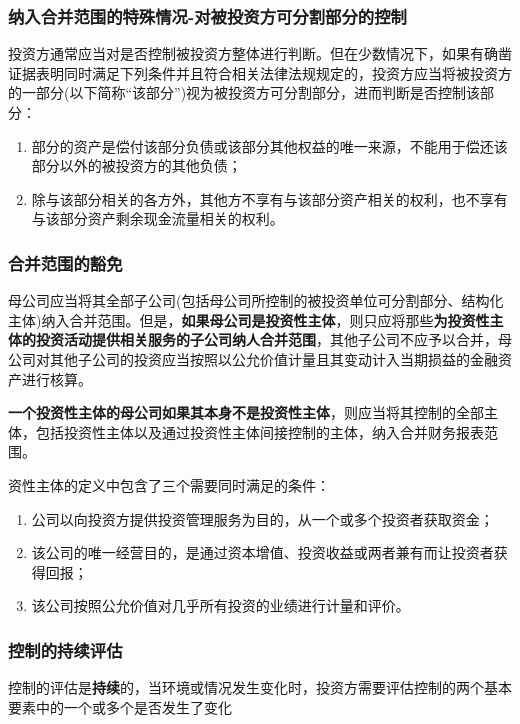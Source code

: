 \documentclass[UTF8,12pt]{ctexart}
\numberwithin{equation}{section} %
\numberwithin{figure}{section}
\numberwithin{table}{section}
\begin{document}
		
	\subsubsection{纳入合并范围的特殊情况-对被投资方可分割部分的控制}
	投资方通常应当对是否控制被投资方整体进行判断。但在少数情况下，如果有确凿证据表明同时满足下列条件并且符合相关法律法规规定的，投资方应当将被投资方的一部分(以下简称“该部分”)视为被投资方可分割部分，进而判断是否控制该部分：
	\begin{enumerate}
		\item 部分的资产是偿付该部分负债或该部分其他权益的唯一来源，不能用于偿还该部分以外的被投资方的其他负债；
		
		\item 除与该部分相关的各方外，其他方不享有与该部分资产相关的权利，也不享有与该部分资产剩余现金流量相关的权利。
	\end{enumerate}
	
	\subsubsection{合并范围的豁免}
	母公司应当将其全部子公司(包括母公司所控制的被投资单位可分割部分、结构化主体)纳入合并范围。但是，\textbf{如果母公司是投资性主体}，则只应将那些\textbf{为投资性主体的投资活动提供相关服务的子公司纳人合并范围}，其他子公司不应予以合并，母公司对其他子公司的投资应当按照以公允价值计量且其变动计入当期损益的金融资产进行核算。
	
	\textbf{一个投资性主体的母公司如果其本身不是投资性主体}，则应当将其控制的全部主体，包括投资性主体以及通过投资性主体间接控制的主体，纳入合并财务报表范围。
	
	资性主体的定义中包含了三个需要同时满足的条件：
	\begin{enumerate}
		\item 公司以向投资方提供投资管理服务为目的，从一个或多个投资者获取资金；
		
		\item 该公司的唯一经营目的，是通过资本增值、投资收益或两者兼有而让投资者获得回报；
		
		\item 该公司按照公允价值对几乎所有投资的业绩进行计量和评价。
	\end{enumerate}
	\subsubsection{控制的持续评估}
	控制的评估是\textbf{持续}的，当环境或情况发生变化时，投资方需要评估控制的两个基本要素中的一个或多个是否发生了变化
	
\end{document}

